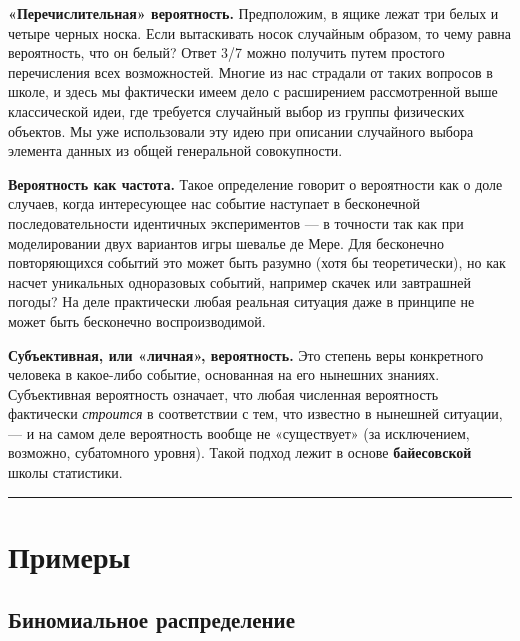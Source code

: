 \documentclass[11pt,a4paper]{article}
\renewcommand{\linethickness}{0.1ex}
\begin{document}
\textbf{«Перечислительная» вероятность.} Предположим, в ящике лежат три
белых и четыре черных носка. Если вытаскивать носок случайным образом,
то чему равна вероятность, что он белый? Ответ 3/7 можно получить путем
простого перечисления всех возможностей. Многие из нас страдали от таких
вопросов в школе, и здесь мы фактически имеем дело с расширением
рассмотренной выше классической идеи, где требуется случайный выбор из
группы физических объектов. Мы уже использовали эту идею при описании
случайного выбора элемента данных из общей генеральной совокупности.

\textbf{Вероятность как частота.} Такое определение говорит о
вероятности как о доле случаев, когда интересующее нас событие наступает
в бесконечной последовательности идентичных экспериментов --- в точности
так как при моделировании двух вариантов игры шевалье де Мере. Для
бесконечно повторяющихся событий это может быть разумно (хотя бы
теоретически), но как насчет уникальных одноразовых событий, например
скачек или завтрашней погоды? На деле практически любая реальная
ситуация даже в принципе не может быть бесконечно воспроизводимой.

\textbf{Субъективная, или «личная», вероятность.} Это степень веры
конкретного человека в какое-либо событие, основанная на его нынешних
знаниях. Субъективная вероятность означает, что любая численная
вероятность фактически \emph{строится} в соответствии с тем, что
известно в нынешней ситуации, --- и на самом деле вероятность вообще не
«существует» (за исключением, возможно, субатомного уровня). Такой
подход лежит в основе \textbf{байесовской} школы статистики.

    \begin{center}\rule{0.5\linewidth}{\linethickness}\end{center}

    \hypertarget{ux43fux440ux438ux43cux435ux440ux44b}{%
\section{Примеры}\label{ux43fux440ux438ux43cux435ux440ux44b}}

    \hypertarget{ux431ux438ux43dux43eux43cux438ux430ux43bux44cux43dux43eux435-ux440ux430ux441ux43fux440ux435ux434ux435ux43bux435ux43dux438ux435}{%
\subsection{Биномиальное
распределение}\label{ux431ux438ux43dux43eux43cux438ux430ux43bux44cux43dux43eux435-ux440ux430ux441ux43fux440ux435ux434ux435ux43bux435ux43dux438ux435}}
\end{document}
